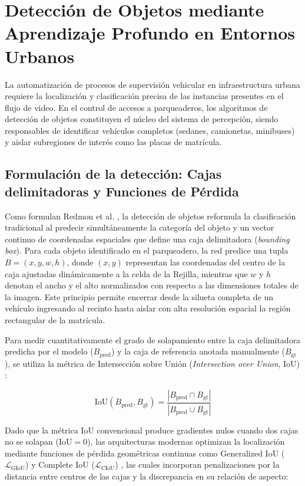 \section{Detección de Objetos mediante Aprendizaje Profundo en Entornos Urbanos}

La automatización de procesos de supervisión vehicular en infraestructura urbana
requiere la localización y clasificación precisa de las instancias presentes en
el flujo de video. En el control de accesos a parqueaderos, los algoritmos de
detección de objetos constituyen el núcleo del sistema de percepción, siendo
responsables de identificar vehículos completos (sedanes, camionetas, minibuses)
y aislar subregiones de interés como las placas de matrícula.

\subsection{Formulación de la detección: Cajas delimitadoras y Funciones de Pérdida}

Como formulan Redmon et al. \cite{redmon2016yolo}, la detección de objetos
reformula la clasificación tradicional al predecir simultáneamente la categoría
del objeto y un vector continuo de coordenadas espaciales que define una caja
delimitadora (\textit{bounding box}). Para cada objeto identificado en el
parqueadero, la red predice una tupla $B = (x, y, w, h)$, donde $(x, y)$
representan las coordenadas del centro de la caja ajustadas dinámicamente a la
celda de la Rejilla, mientras que $w$ y $h$ denotan el ancho y el alto
normalizados con respecto a las dimensiones totales de la imagen. Este principio
permite encerrar desde la silueta completa de un vehículo ingresando al recinto
hasta aislar con alta resolución espacial la región rectangular de la matrícula.

Para medir cuantitativamente el grado de solapamiento entre la caja delimitadora
predicha por el modelo ($B_{\text{pred}}$) y la caja de referencia anotada
manualmente ($B_{\text{gt}}$), se utiliza la métrica de Intersección sobre Unión
(\textit{Intersection over Union}, IoU) \cite{rezatofighi2019giou}:

\begin{equation}
    \text{IoU}(B_{\text{pred}}, B_{\text{gt}})
    =
    \frac{|B_{\text{pred}} \cap B_{\text{gt}}|}{|B_{\text{pred}} \cup B_{\text{gt}}|}
\end{equation}

Dado que la métrica IoU convencional produce gradientes nulos cuando dos cajas
no se solapan ($\text{IoU} = 0$), las arquitecturas modernas optimizan la
localización mediante funciones de pérdida geométricas continuas como
Generalized IoU ($\mathcal{L}_{\text{GIoU}}$) y Complete IoU
($\mathcal{L}_{\text{CIoU}}$) \cite{zheng2020diou}, las cuales incorporan
penalizaciones por la distancia entre centros de las cajas y la discrepancia en
su relación de aspecto:

